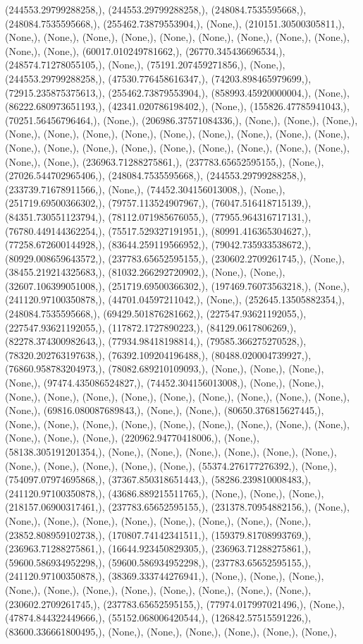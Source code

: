 \documentclass{article}
\begin{document}
(244553.29799288258,), (244553.29799288258,), (248084.7535595668,), (248084.7535595668,), (255462.73879553904,), (None,), (210151.30500305811,), (None,), (None,), (None,), (None,), (None,), (None,), (None,), (None,), (None,), (None,), (None,), (60017.010249781662,), (26770.345436696534,), (248574.71278055105,), (None,), (75191.207459271856,), (None,), (244553.29799288258,), (47530.776458616347,), (74203.898465979699,), (72915.235875375613,), (255462.73879553904,), (858993.45920000004,), (None,), (86222.680973651193,), (42341.020786198402,), (None,), (155826.47785941043,), (70251.56456796464,), (None,), (206986.37571084336,), (None,), (None,), (None,), (None,), (None,), (None,), (None,), (None,), (None,), (None,), (None,), (None,), (None,), (None,), (None,), (None,), (None,), (None,), (None,), (None,), (None,), (None,), (None,), (236963.71288275861,), (237783.65652595155,), (None,), (27026.544702965406,), (248084.7535595668,), (244553.29799288258,), (233739.71678911566,), (None,), (74452.304156013008,), (None,), (251719.69500366302,), (79757.113524907967,), (76047.516418715139,), (84351.730551123794,), (78112.071985676055,), (77955.964316717131,), (76780.449144362254,), (75517.529327191951,), (80991.416365304627,), (77258.672600144928,), (83644.259119566952,), (79042.735933538672,), (80929.008659643572,), (237783.65652595155,), (230602.2709261745,), (None,), (38455.219214325683,), (81032.266292720902,), (None,), (None,), (32607.106399051008,), (251719.69500366302,), (197469.76073563218,), (None,), (241120.97100350878,), (44701.04597211042,), (None,), (252645.13505882354,), (248084.7535595668,), (69429.501876281662,), (227547.93621192055,), (227547.93621192055,), (117872.1727890223,), (84129.0617806269,), (82278.374300982643,), (77934.98418198814,), (79585.366275270528,), (78320.202763197638,), (76392.109204196488,), (80488.020004739927,), (76860.958783204973,), (78082.689210109093,), (None,), (None,), (None,), (None,), (97474.435086524827,), (74452.304156013008,), (None,), (None,), (None,), (None,), (None,), (None,), (None,), (None,), (None,), (None,), (None,), (None,), (69816.080087689843,), (None,), (None,), (80650.376815627445,), (None,), (None,), (None,), (None,), (None,), (None,), (None,), (None,), (None,), (None,), (None,), (None,), (220962.94770418006,), (None,), (58138.305191201354,), (None,), (None,), (None,), (None,), (None,), (None,), (None,), (None,), (None,), (None,), (None,), (55374.276177276392,), (None,), (754097.07974695868,), (37367.850318651443,), (58286.239810008483,), (241120.97100350878,), (43686.889215511765,), (None,), (None,), (None,), (218157.06900317461,), (237783.65652595155,), (231378.70954882156,), (None,), (None,), (None,), (None,), (None,), (None,), (None,), (None,), (None,), (23852.808959102738,), (170807.74142341511,), (159379.81708993769,), (236963.71288275861,), (16644.923450829305,), (236963.71288275861,), (59600.586934952298,), (59600.586934952298,), (237783.65652595155,), (241120.97100350878,), (38369.333744276941,), (None,), (None,), (None,), (None,), (None,), (None,), (None,), (None,), (None,), (None,), (None,), (230602.2709261745,), (237783.65652595155,), (77974.017997021496,), (None,), (47874.844322449666,), (55152.068006420544,), (126842.57515591226,), (83600.336661800495,), (None,), (None,), (None,), (None,), (None,), (None,), 
\end{document}

